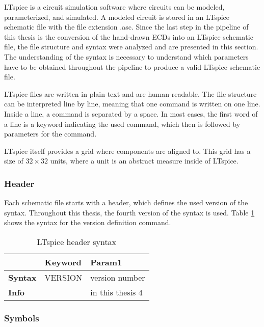 \label{sec:ltspice}

LTspice is a circuit simulation software where circuits can be modeled, parameterized, and simulated.
A modeled circuit is stored in an LTspice schematic file with the file extension .asc.
Since the last step in the pipeline of this thesis is the conversion of the hand-drawn \acp{ECD} into an LTspice schematic file, the file structure and syntax were analyzed and are presented in this section.
The understanding of the syntax is necessary to understand which parameters have to be obtained throughout the pipeline to produce a valid LTspice schematic file.

LTspice files are written in plain text and are human-readable.
The file structure can be interpreted line by line, meaning that one command is written on one line.
Inside a line, a command is separated by a space.
In most cases, the first word of a line is a keyword indicating the used command, which then is followed by parameters for the command.

LTspice itself provides a grid where components are aligned to.
This grid has a size of $32 \times 32$ units, where a unit is an abstract measure inside of LTspice.

\subsubsection{Header}

Each schematic file starts with a header, which defines the used version of the syntax.
Throughout this thesis, the fourth version of the syntax is used. Table \ref{tab:ltheader_syntax} shows the syntax for the version definition command.

\begin{table}[H]
\begin{center}

\begin{tabular}{l|l|l}
    & \textbf{Keyword} & \textbf{Param1}\\
    \hline
    \textbf{Syntax} & VERSION & version number\\
    \textbf{Info} & & in this thesis 4
\end{tabular}
\caption{LTspice header syntax}
\label{tab:ltheader_syntax}

\end{center}
\end{table}


\subsubsection{Symbols}

